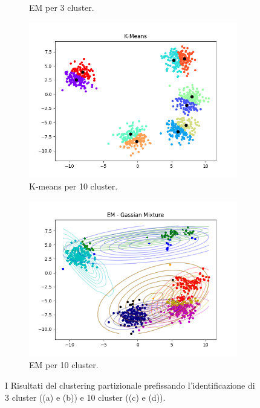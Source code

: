 \documentclass{llncs}
\begin{document}
\begin{figure}[h]
\begin{subfigure}{.5\textwidth}
		  \caption{EM per 3 cluster.}
		  \label{part:b}
		\end{subfigure}
		\begin{subfigure}{.5\textwidth}
			\centering
			\includegraphics[width=\linewidth]{immagini/5_clusters_kmeans_10.png}
			\caption{K-means per 10 cluster.}
			\label{part:c}			
		  \end{subfigure}
		  \begin{subfigure}{.5\textwidth}
			\centering
			\includegraphics[width=\linewidth]{immagini/5_clusters_gmm_10.png}
			\caption{EM per 10 cluster.}
			\label{part:d}			
		  \end{subfigure}
		\caption{I Risultati del clustering partizionale prefissando
		l'identificazione di 3 cluster ((a) e (b)) e 10 cluster ((c) e (d)).}
		\label{part:test}
	\end{figure}
\end{document}
